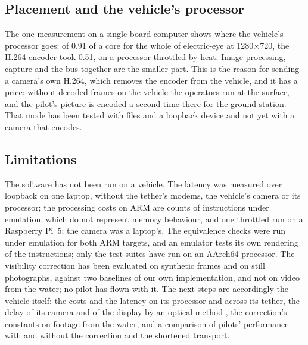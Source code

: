 \subsection{Placement and the vehicle's processor}

The one measurement on a single-board computer shows where the
vehicle's processor
goes: of 0.91 of a core for the whole of electric-eye at
1280$\times$720, the H.264
encoder took 0.51, on a processor throttled by heat. Image
processing, capture and
the bus together are the smaller part. This is the reason for sending
a camera's own
H.264, which removes the encoder from the vehicle, and it has a price: without
decoded frames on the vehicle the operators run at the surface, and the pilot's
picture is encoded a second time there for the ground station. That
mode has been
tested with files and a loopback device and not yet with a camera that encodes.

\subsection{Limitations}

The software has not been run on a vehicle. The latency was measured
over loopback on
one laptop, without the tether's modems, the vehicle's camera or its
processor; the
processing costs on ARM are counts of instructions under emulation, which do not
represent memory behaviour, and one throttled run on a Raspberry
Pi~5; the camera was
a laptop's. The equivalence checks were run under emulation for both ARM
targets, and an emulator tests its own rendering of the instructions;
only the test
suites have run on an AArch64 processor. The visibility
correction has been evaluated on synthetic frames and on still photographs,
against two baselines of our own implementation, and not on video from the
water; no pilot has flown with it.
The next steps are accordingly the vehicle itself: the costs and the
latency on its
processor and across its tether, the delay of its camera and of the
display by an
optical method \cite{bachhuber2016}, the correction's constants on
footage from the
water, and a comparison of pilots' performance with and without the
correction and
the shortened transport.
